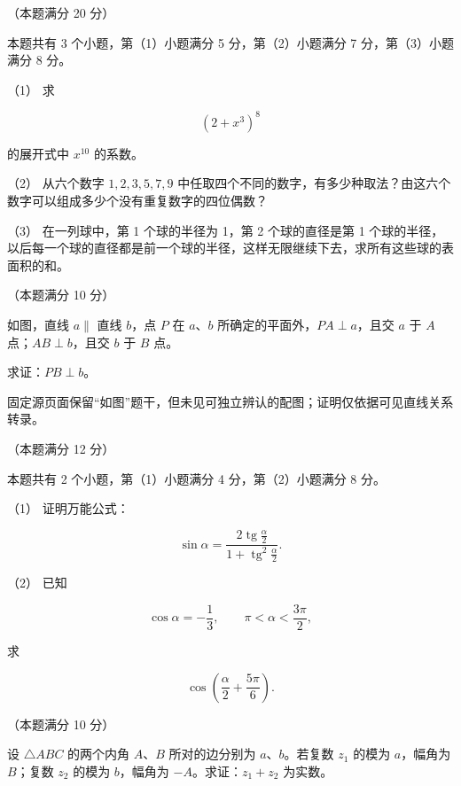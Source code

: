 \begin{question}
（本题满分 20 分）

本题共有 3 个小题，第（1）小题满分 5 分，第（2）小题满分 7 分，第（3）小题满分 8 分。

（1） 求

\nopagebreak[4]
\[
(2+x^3)^8
\]

的展开式中 $x^{10}$ 的系数。

（2） 从六个数字 $1,2,3,5,7,9$ 中任取四个不同的数字，有多少种取法？由这六个数字可以组成多少个没有重复数字的四位偶数？

（3） 在一列球中，第 1 个球的半径为 1，第 2 个球的直径是第 1 个球的半径，以后每一个球的直径都是前一个球的半径，这样无限继续下去，求所有这些球的表面积的和。

\end{question}
\begin{question}
（本题满分 10 分）

如图，直线 $a\parallel$ 直线 $b$，点 $P$ 在 $a\text{、}b$ 所确定的平面外，$PA\perp a$，且交 $a$ 于 $A$ 点；$AB\perp b$，且交 $b$ 于 $B$ 点。

求证：$PB\perp b$。

\begin{gktip}
固定源页面保留“如图”题干，但未见可独立辨认的配图；证明仅依据可见直线关系转录。
\end{gktip}

\end{question}
\begin{question}
（本题满分 12 分）

本题共有 2 个小题，第（1）小题满分 4 分，第（2）小题满分 8 分。

（1） 证明万能公式：

\nopagebreak[4]
\[
\sin\alpha=\frac{2\operatorname{tg}\frac\alpha2}
{1+\operatorname{tg}^2\frac\alpha2}.
\]

（2） 已知

\nopagebreak[4]
\[
\cos\alpha=-\frac13,\qquad
\pi<\alpha<\frac{3\pi}{2},
\]

求

\nopagebreak[4]
\[
\cos\left(\frac\alpha2+\frac{5\pi}{6}\right).
\]

\end{question}
\begin{question}
（本题满分 10 分）

设 $\triangle ABC$ 的两个内角 $A\text{、}B$ 所对的边分别为 $a\text{、}b$。若复数 $z_1$ 的模为 $a$，幅角为 $B$；复数 $z_2$ 的模为 $b$，幅角为 $-A$。求证：$z_1+z_2$ 为实数。

\end{question}
